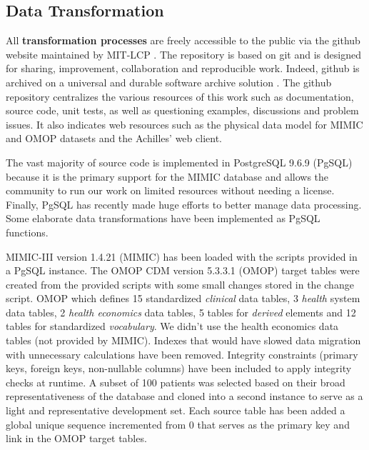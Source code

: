 %
%
\subsection{Data Transformation}

All \textbf{transformation processes} are freely accessible to the public via
the github website \cite{mimic-omop-website} maintained by MIT-LCP
\cite{mimic-nature}.  The repository is based on git and is designed for
sharing, improvement, collaboration and reproducible work. Indeed, github is
archived on a universal and durable software archive solution
\cite{universal-archive}.  The github repository centralizes the various
resources of this work such as documentation, source code, unit tests, as well
as questioning examples, discussions and problem issues. 
It also indicates web resources such as the physical data model 
for MIMIC\cite{mimic-schemaspy} and OMOP\cite{omop-schemaspy}
datasets and the Achilles' web client\cite{mimic-omop-achilles}.

The vast majority of source code is implemented in PostgreSQL 9.6.9 (PgSQL) 
because it is the primary support for the MIMIC database and allows the community 
to run our work on limited resources without needing a license. 
Finally, PgSQL has recently made huge efforts to better manage data processing. 
Some elaborate data transformations have been implemented as PgSQL functions.

MIMIC-III version 1.4.21 (MIMIC) has been loaded with the scripts provided in a PgSQL 
instance. The OMOP CDM version 5.3.3.1 (OMOP) target tables were created from the 
provided scripts with some small changes stored in the change script. 
OMOP which defines 15 standardized \textit{clinical} data tables, 3 \textit{health} 
system data tables, 2 \textit{health economics} data tables, 5 tables for \textit{derived} 
elements and 12 tables for standardized \textit{vocabulary}. We didn't use the health 
economics data tables (not provided by MIMIC). Indexes that would have slowed
data migration with unnecessary calculations have been removed. Integrity
constraints (primary keys, foreign keys, non-nullable columns) have been
included to apply integrity checks at runtime. 
A subset of 100 patients was selected based on their broad representativeness 
of the database and cloned into a second instance to serve as a light and 
representative development set. Each source table has been added a global unique 
sequence incremented from 0 that serves as the primary key and link in the OMOP 
target tables.

